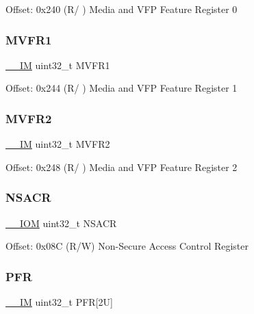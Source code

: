 Offset\+: 0x240 (R/ ) Media and V\+FP Feature Register 0 \mbox{\label{struct_s_c_b___type_a0a610dc4212de3ce1ad62e9afa76c728}} 
\subsubsection{\texorpdfstring{M\+V\+F\+R1}{MVFR1}}
{\footnotesize\ttfamily \mbox{\hyperlink{core__cm4_8h_a4cc1649793116d7c2d8afce7a4ffce43}{\+\_\+\+\_\+\+IM}} uint32\+\_\+t M\+V\+F\+R1}

Offset\+: 0x244 (R/ ) Media and V\+FP Feature Register 1 \mbox{\label{struct_s_c_b___type_a8353348c9336aa1aadcbf86b6f0f18c9}} 
\subsubsection{\texorpdfstring{M\+V\+F\+R2}{MVFR2}}
{\footnotesize\ttfamily \mbox{\hyperlink{core__cm4_8h_a4cc1649793116d7c2d8afce7a4ffce43}{\+\_\+\+\_\+\+IM}} uint32\+\_\+t M\+V\+F\+R2}

Offset\+: 0x248 (R/ ) Media and V\+FP Feature Register 2 \mbox{\label{struct_s_c_b___type_a3b7fa817ab498ce63563c73ae316c9b6}} 
\subsubsection{\texorpdfstring{N\+S\+A\+CR}{NSACR}}
{\footnotesize\ttfamily \mbox{\hyperlink{core__cm4_8h_ab6caba5853a60a17e8e04499b52bf691}{\+\_\+\+\_\+\+I\+OM}} uint32\+\_\+t N\+S\+A\+CR}

Offset\+: 0x08C (R/W) Non-\/\+Secure Access Control Register \mbox{\label{struct_s_c_b___type_a602fa5eae6a772dbb09970d304e75690}} 
\subsubsection{\texorpdfstring{P\+FR}{PFR}}
{\footnotesize\ttfamily \mbox{\hyperlink{core__cm4_8h_a4cc1649793116d7c2d8afce7a4ffce43}{\+\_\+\+\_\+\+IM}} uint32\+\_\+t P\+FR\mbox{[}2\+U\mbox{]}}

